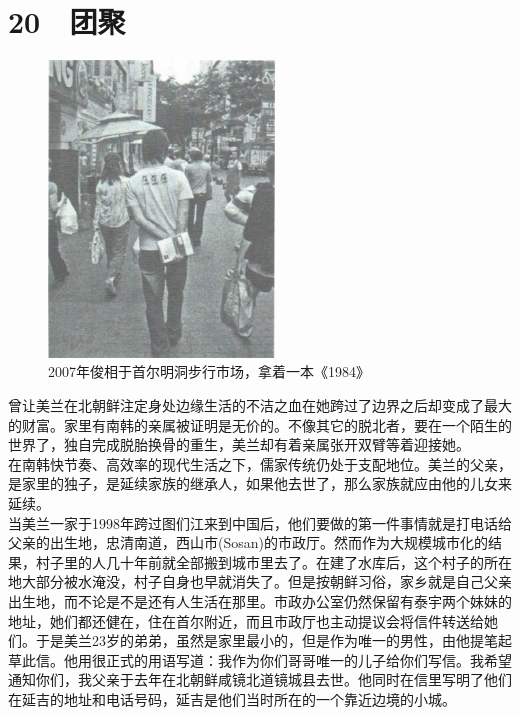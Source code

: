 \fancyhead[RO]{{\tiny{\textcolor{Gray}{\FA \ }}}\thepage}
\fancyhead[LE]{{\tiny{\textcolor{Gray}{\FA \ }}}\thepage}
\fancyfoot[LE,RO]{}
\fancyfoot[LO,CE]{}
\fancyfoot[CO,RE]{}
\chapter*{20 {\FA } 团聚}
\begin{figure}[!htbp]
\centering
\includegraphics[width=6cm]{./Chapters/Images/20.jpg}
\caption*{2007年俊相于首尔明洞步行市场，拿着一本《1984》}
\end{figure}

曾让美兰在北朝鲜注定身处边缘生活的不洁之血在她跨过了边界之后却变成了最大的财富。家里有南韩的亲属被证明是无价的。不像其它的脱北者，要在一个陌生的世界了，独自完成脱胎换骨的重生，美兰却有着亲属张开双臂等着迎接她。\\

在南韩快节奏、高效率的现代生活之下，儒家传统仍处于支配地位。美兰的父亲，是家里的独子，是延续家族的继承人，如果他去世了，那么家族就应由他的儿女来延续。\\

当美兰一家于1998年跨过图们江来到中国后，他们要做的第一件事情就是打电话给父亲的出生地，忠清南道，西山市(Sosan)的市政厅。然而作为大规模城市化的结果，村子里的人几十年前就全部搬到城市里去了。在建了水库后，这个村子的所在地大部分被水淹没，村子自身也早就消失了。但是按朝鲜习俗，家乡就是自己父亲出生地，而不论是不是还有人生活在那里。市政办公室仍然保留有泰宇两个妹妹的地址，她们都还健在，住在首尔附近，而且市政厅也主动提议会将信件转送给她们。于是美兰23岁的弟弟，虽然是家里最小的，但是作为唯一的男性，由他提笔起草此信。他用很正式的用语写道：我作为你们哥哥唯一的儿子给你们写信。我希望通知你们，我父亲于去年在北朝鲜咸镜北道镜城县去世。他同时在信里写明了他们在延吉的地址和电话号码，延吉是他们当时所在的一个靠近边境的小城。\\

